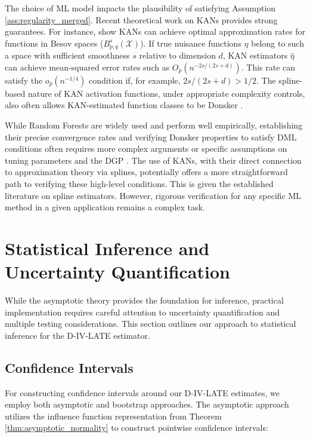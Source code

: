 \documentclass[final,3p,fleqn, 10pt]{elsarticle}
\begin{document}
The choice of ML model impacts the plausibility of satisfying Assumption \ref{ass:regularity_merged}. Recent theoretical work on KANs provides strong guarantees. For instance, \citet{kratsios2025kolmogorov} show KANs can achieve optimal approximation rates for functions in Besov spaces ($B^{s}_{p,q}(\mathcal{X})$). If true nuisance functions $\eta$ belong to such a space with sufficient smoothness $s$ relative to dimension $d$, KAN estimators $\hat{\eta}$ can achieve mean-squared error rates such as $O_p(n^{-2s/(2s+d)})$. This rate can satisfy the $o_p(n^{-1/4})$ condition if, for example, $2s/(2s+d) > 1/2$. The spline-based nature of KAN activation functions, under appropriate complexity controls, also often allows KAN-estimated function classes to be Donsker \citep[e.g.][]{newey1997convergence}.

While Random Forests are widely used and perform well empirically, establishing their precise convergence rates and verifying Donsker properties to satisfy DML conditions often requires more complex arguments or specific assumptions on tuning parameters and the DGP \citep{wager2015adaptive, athey2019generalized, peng2022rates}. The use of KANs, with their direct connection to approximation theory via splines, potentially offers a more straightforward path to verifying these high-level conditions. This is given the established literature on spline estimators. However, rigorous verification for any specific ML method in a given application remains a complex task.

\section{Statistical Inference and Uncertainty Quantification}
\label{sec:inference}

While the asymptotic theory provides the foundation for inference, practical implementation requires careful attention to uncertainty quantification and multiple testing considerations. This section outlines our approach to statistical inference for the D-IV-LATE estimator.

\subsection{Confidence Intervals}

For constructing confidence intervals around our D-IV-LATE estimates, we employ both asymptotic and bootstrap approaches. The asymptotic approach utilizes the influence function representation from Theorem \ref{thm:asymptotic_normality} to construct pointwise confidence intervals:
\end{document}
